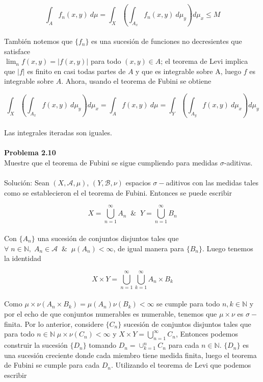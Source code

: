 \documentclass[12pt]{article}
\begin{document}
    \[\int_Af_n(x,y)\:d\mu=\int_X \left(\int_{A_x}f_n(x,y)\:d\mu_{y}\right)d\mu_x \leq M\]
    \\
    Tambi\'en notemos que $\{f_n\}$  es una sucesi\'on de  funciones no  decresientes que satisface \\
    $\lim_nf(x,y)=|f(x,y)|$ para todo $(x,y)\in A$; el teorema de Levi implica que $|f|$ es finito en casi 
    todas partes de $A$ y que es integrable sobre A, luego $f$ es integrable sobre $A$. Ahora, 
    usando el teorema de Fubini se obtiene

    \[\int_X \left(\int_{A_x}f(x,y)\:d\mu_{y}\right)d\mu_x=\int_Af(x,y)\:d\mu=\int_Y \left(\int_{A_y}f(x,y)\:d\mu_{x}\right)d\mu_y\]
    \\
    Las integrales iteradas son iguales.
    \\ \\

    \textbf{Problema 2.10}\\

    Muestre que el teorema de Fubini se sigue cumpliendo para medidas $\sigma$-aditivas.
    \\ \\
    Soluci\'on:
    Sean $(X,\mathscr{A},\mu)$, $(Y,\mathscr{B},\nu)$ espacios $\sigma-$aditivos con las medidas
    tales como se establecieron el el teorema de Fubini. Entonces se puede escribir 

    \[X=\bigcup_{n=1}^{\infty}A_n \; \; \& \; \; Y=\bigcup_{n=1}^{\infty}B_n\]
    \\
    Con $\{A_n\}$ una sucesi\'on de conjuntos disjuntos tales que $\forall \;n\in \mathbb{N}, \; A_n\in \mathscr{A} \;\; \& \;\; \mu(A_n)<\infty$,
    de igual manera para $\{B_n\}$. Luego tenemos la identidad

    \[X\times Y=\bigcup_{n=1}^{\infty}\bigcup_{k=1}^{\infty}A_n\times B_k\]
    \\
    Como $\mu \times \nu (A_n \times B_k)=\mu(A_n)\nu(B_k) < \infty$ se cumple para todo $n,k\in \mathbb{N}$
    y por el echo de que conjuntos numerables es numerable, tenemos  que $\mu \times \nu$ es 
    $\sigma-$finita. Por lo anterior, considere $\{C_n\}$ sucesi\'on de conjuntos disjuntos tales que
    para todo $n\in \mathbb{N} \; \mu \times \nu (C_n)<\infty$ y $X\times Y=\bigcup_{n=1}^{\infty}C_n$,
    Entonces podemos construir la sucesi\'on $\{D_n\}$ tomando $D_n=\cup_{k=1}^n C_n$ para cada $n\in \mathbb{N}$.
    $\{D_n\}$ es una sucesi\'on creciente donde cada miembro tiene medida finita, luego el 
    teorema de Fubini se cumple para cada $D_n$. Utilizando el teorema de Levi que podemos escribir
\end{document}
